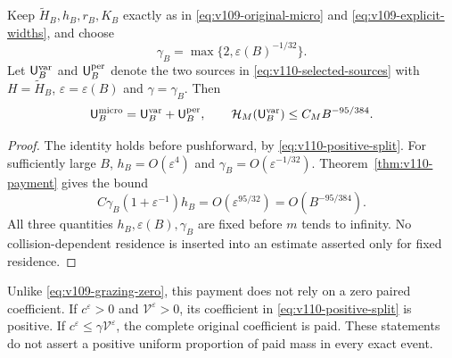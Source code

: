 \begin{corollary}
\label{cor:v110-schedule}
Keep $\widetilde H_B,h_B,r_B,K_B$ exactly as in
\eqref{eq:v109-original-micro} and \eqref{eq:v109-explicit-widths},
and choose
\begin{equation}\label{eq:v110-gamma}
 \gamma_B=\max\{2,\varepsilon(B)^{-1/32}\}.
\end{equation}
Let $\mathsf U_B^{\rm var}$ and $\mathsf U_B^{\rm per}$ denote the
two sources in \eqref{eq:v110-selected-sources} with
$H=\widetilde H_B$, $\varepsilon=\varepsilon(B)$ and
$\gamma=\gamma_B$. Then
\begin{equation}\label{eq:v110-source-identity}
 \mathsf U_B^{\rm micro}=\mathsf U_B^{\rm var}
                         +\mathsf U_B^{\rm per},\qquad
 \mathcal H_M(\mathsf U_B^{\rm var})\le C_MB^{-95/384}.
\end{equation}
\end{corollary}
\begin{proof}
The identity holds before pushforward, by
\eqref{eq:v110-positive-split}. For sufficiently large $B$,
$h_B=O(\varepsilon^4)$ and $\gamma_B=O(\varepsilon^{-1/32})$.
Theorem~\ref{thm:v110-payment} gives the bound
\[
 C\gamma_B(1+\varepsilon^{-1})h_B
      =O(\varepsilon^{95/32})=O(B^{-95/384}).
\]
All three quantities $h_B,\varepsilon(B),\gamma_B$ are fixed before
$m$ tends to infinity. No collision-dependent residence is inserted
into an estimate asserted only for fixed residence.
\end{proof}

Unlike \eqref{eq:v109-grazing-zero}, this payment does not rely on a
zero paired coefficient. If $c^\varepsilon>0$ and
$\mathcal V^\varepsilon>0$, its coefficient in
\eqref{eq:v110-positive-split} is positive. If
$c^\varepsilon\le\gamma\mathcal V^\varepsilon$, the complete
original coefficient is paid. These statements do not assert a
positive uniform proportion of paid mass in every exact event.
